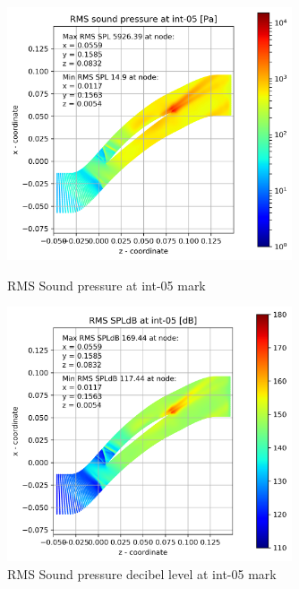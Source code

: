 \begin{figure}[ht]
  \centering
  \includegraphics[width=0.75\textwidth]{Figures/int-05-rms-spl.png}
  \caption{RMS Sound pressure at int-05 mark} \label{int-05-rms-spl}
  
  \vspace*{\floatsep}%

  \includegraphics[width=0.75\textwidth]{Figures/int-05-rms-spldb.png}
  \caption{RMS Sound pressure decibel level at int-05 mark} \label{int-05-rms-spldb}
\end{figure}
